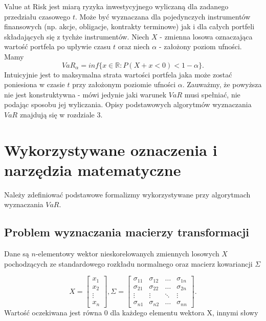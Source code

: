 \documentclass[12pt,titlepage]{article}
\numberwithin{equation}{section}
\begin{document}
Value at Risk jest miarą ryzyka inwestycyjnego wyliczaną dla zadanego przedziału czasowego $t$. Może być wyznaczana dla pojedynczych instrumentów finansowych (np. akcje, obligacje, kontrakty terminowe) jak i dla całych portfeli składających się z tychże instrumentów. Niech $X$ - zmienna losowa oznaczająca wartość portfela po upływie czasu $t$ oraz niech $\alpha$ - założony poziom ufności. Mamy
$$VaR_{\alpha}=inf\{ x\in \mathbb{R}:P(X+x<0) <  1-\alpha \}.$$
Intuicyjnie jest to maksymalna strata wartości portfela jaka może zostać poniesiona w czasie $t$ przy założonym poziomie ufności $\alpha$. Zauważmy, że powyższa nie jest konstruktywna - mówi jedynie jaki warunek $VaR$ musi spełniać, nie podając sposobu jej wyliczania. Opisy podstawowych algorytmów wyznaczania $VaR$ znajdują się w rozdziale 3.


\newpage
\section{Wykorzystywane oznaczenia i narzędzia matematyczne}
Należy zdefiniować podstawowe formalizmy wykorzystywane przy algorytmach wyznaczania $VaR$. 






\subsection{Problem wyznaczania macierzy transformacji} \label{mtransformacji}
Dane są $n$-elementowy wektor nieskorelowanych zmiennych losowych $X$ pochodzących ze standardowego rozkładu normalnego oraz macierz kowariancji $\Sigma$

\begin{equation} 
X=
\begin{bmatrix}
 x_1 \\ 
 x_2 \\
\vdots \\
x_n
\end{bmatrix}
,\Sigma=\begin{bmatrix}
\sigma_{11} & \sigma_{12} & \hdots & \sigma_{1n} \\ 
\sigma_{21} & \sigma_{22} & \hdots & \sigma_{2n} \\
\vdots & \vdots & \ddots & \vdots\\
\sigma_{n1} & \sigma_{n2} & \hdots & \sigma_{nn}
\end{bmatrix}.
\end{equation} 
Wartość oczekiwana jest  równa 0 dla każdego elementu wektora X, innymi słowy
\end{document}
